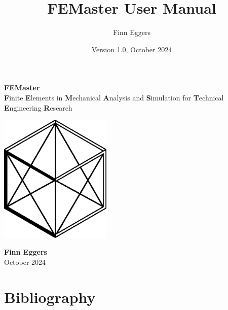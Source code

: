 \documentclass[10pt,a4paper]{book}
\title{FEMaster User Manual}
\author{Finn Eggers}
\date{Version 1.0, October 2024}
\begin{document}
\begin{titlepage}
\begin{center}

    \vspace*{2cm} %

    {\Huge \textbf{FEMaster}} \\
    \vspace{0.3cm}
    \textbf{F}inite \textbf{E}lements in \textbf{M}echanical \textbf{A}nalysis and \textbf{S}imulation for \textbf{T}echnical \textbf{E}ngineering \textbf{R}esearch \\

    \vspace{1cm} %

    \includegraphics[width=0.4\textwidth]{logo/logo.eps} %

    \vfill  %

    \textbf{Finn Eggers} \\
    October 2024

\end{center}
\end{titlepage}

\newpage

\tableofcontents
\newpage












\newpage
\chapter*{Bibliography}
\printbibliography
\end{document}
